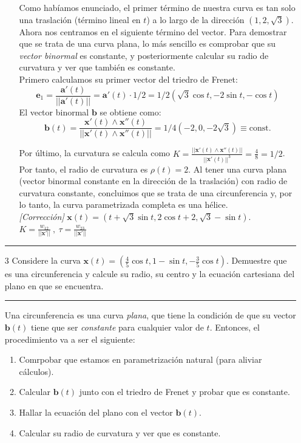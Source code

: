 \begin{enumerate}
\begin{enumerate}
        Como habíamos enunciado, el primer término de nuestra curva es tan solo una traslación (término lineal en $t$) a lo largo de la dirección $(1,2,\sqrt{3})$. \\

        Ahora nos centramos en el siguiente término del vector. Para demostrar que se trata de una curva plana, lo más sencillo es comprobar que su \emph{vector binormal} es constante, y posteriormente calcular su radio de curvatura y ver que también es constante. \\
        Primero calculamos su primer vector del triedro de Frenet:
        $$
        \mathbf{e}_1=\frac{\mathbf{a'}(t)}{||\mathbf{a'}(t)||}=\mathbf{a'}(t)\cdot 1/2=1/2\left (\sqrt{3}\cos t,-2\sin t,-\cos t\right )
        $$
        El vector binormal $\mathbf{b}$ se obtiene como:
        $$
        \mathbf{b}(t)=\frac{\mathbf{x'}(t)\wedge \mathbf{x''}(t)}{||\mathbf{x'}(t)\wedge \mathbf{x''}(t)||}=1/4 \left ( -2,0,-2\sqrt{3} \right )\equiv \text{const.}
        $$

        Por último, la curvatura se calcula como $K=\frac{||\mathbf{x'}(t)\wedge \mathbf{x''}(t)||}{||\mathbf{x'}(t)||^3}=\frac{4}{8}=1/2$. Por tanto, el radio de curvatura es $\boxed{\rho(t)=2}$. Al tener una curva plana (vector binormal constante en la dirección de la traslación) con radio de curvatura constante, concluimos que se trata de una circunferencia y, por lo tanto, la curva parametrizada completa es una hélice.\\
        
        \textit{[Corrección]} $\mathbf{x}(t)=(t+ \sqrt{3}\sin t,2\cos t +2, \sqrt{3}-\sin t)$.\\
        
         $K=\frac{w_{12}}{||\mathbf{x}'||} \ , \ \tau=\frac{w_{23}}{||\mathbf{x}'||}$
    \end{enumerate}
    \noindent\rule{\textwidth}{1pt}
    \item[$\boxed{3}$] Considere la curva $\mathbf{x}(t)=\left ( \frac{4}{5}\cos t,1-\sin t,-\frac{3}{5}\cos t \right )$. Demuestre que es una circunferencia y calcule su radio, su centro y la ecuación cartesiana del plano en que se encuentra.\\
    \noindent\rule{\textwidth}{0.5pt}
    Una circunferencia es una curva \emph{plana}, que tiene la condición de que su vector $\mathbf{b}(t)$ tiene que ser \emph{constante} para cualquier valor de $t$. Entonces, el procedimiento va a ser el siguiente:
    \begin{enumerate}
        \item Comrpobar que estamos en parametrización natural (para aliviar cálculos).
        \item Calcular $\mathbf{b}(t)$ junto con el triedro de Frenet y probar que es constante.
        \item Hallar la ecuación del plano con el vector $\mathbf{b}(t)$.
        \item Calcular su radio de curvatura y ver que es constante.
    \end{enumerate}


\end{enumerate}
